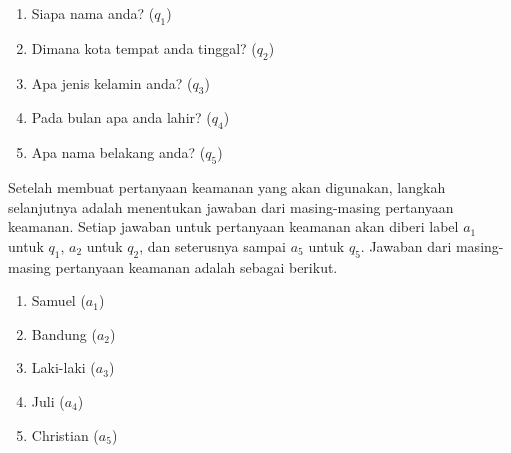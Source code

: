 \begin{enumerate}
	\item Siapa nama anda? (\begin{math}q_1\end{math})
	\item Dimana kota tempat anda tinggal? (\begin{math}q_2\end{math})
	\item Apa jenis kelamin anda? (\begin{math}q_3\end{math})
	\item Pada bulan apa anda lahir? (\begin{math}q_4\end{math})
	\item Apa nama belakang anda? (\begin{math}q_5\end{math})
\end{enumerate}

Setelah membuat pertanyaan keamanan yang akan digunakan, langkah selanjutnya adalah menentukan jawaban dari masing-masing pertanyaan keamanan. Setiap jawaban untuk pertanyaan keamanan akan diberi label \begin{math}a_1\end{math} untuk \begin{math}q_1\end{math}, \begin{math}a_2\end{math} untuk \begin{math}q_2\end{math}, dan seterusnya sampai \begin{math}a_5\end{math} untuk \begin{math}q_5\end{math}. Jawaban dari masing-masing pertanyaan keamanan adalah sebagai berikut.

\begin{enumerate}
	\item Samuel (\begin{math}a_1\end{math})
	\item Bandung (\begin{math}a_2\end{math})
	\item Laki-laki (\begin{math}a_3\end{math})
	\item Juli (\begin{math}a_4\end{math})
	\item Christian (\begin{math}a_5\end{math})
\end{enumerate}

